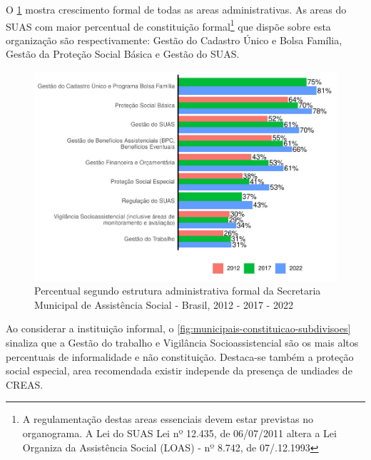 \documentclass[
  brazilian]{report}
\begin{document}
O \cref{fig:munic_sub} mostra crescimento formal de todas as areas
administrativas. As areas do SUAS com maior percentual de constituição
formal\footnote{A regulamentação destas areas essenciais devem estar previstas no organograma. A Lei do SUAS Lei nº 12.435, de 06/07/2011 altera a Lei Organiza da Assistência Social (LOAS) - nº 8.742, de 07/.12.1993}
que dispõe sobre esta organização são respectivamente: Gestão do
Cadastro Único e Bolsa Família, Gestão da Proteção Social Básica e
Gestão do SUAS.

\begin{figure}
\includegraphics{Censo-SUAS-2022_files/figure-latex/munic_sub-1} \caption[Percentual segundo estrutura administrativa formal da Secretaria Municipal de Assistência Social - Brasil, 2012 - 2017 - 2022]{Percentual segundo estrutura administrativa formal da Secretaria Municipal de Assistência Social - Brasil, 2012 - 2017 - 2022}\label{fig:munic_sub}
\end{figure}

Ao considerar a instituição informal, o
\cref{fig:municipais-constituicao-subdivisoes} sinaliza que a Gestão do
trabalho e Vigilância Socioassistencial são os mais altos percentuais de
informalidade e não constituição. Destaca-se também a proteção social
especial, area recomendada existir independe da presença de undiades de
CREAS.
\end{document}
